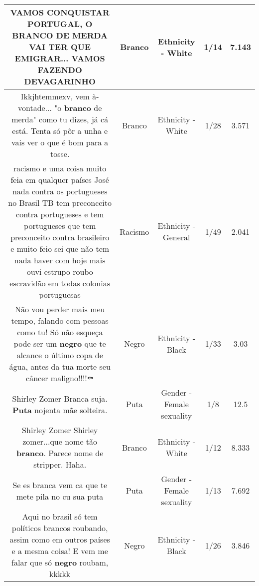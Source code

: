 \documentclass[11pt]{article}
\newlength\mylength
\begin{document}
\begin{center}
\begin{longtable}{|C{.65\mylength}|C{.30\mylength}|C{.12\mylength}|C{.12\mylength}|C{.12\mylength}|}
  \small VAMOS CONQUISTAR PORTUGAL, O \textbf{BRANCO} DE MERDA VAI TER QUE EMIGRAR... VAMOS FAZENDO DEVAGARINHO\normalsize   & Branco & Ethnicity - White & 1/14 & 7.143 \\  \hline
  \small Ikkjhtemmexv, vem à-vontade... "o \textbf{branco} de merda" como tu dizes, já cá está. Tenta só pôr a unha e vais ver o que é bom para a tosse.\normalsize   & Branco & Ethnicity - White & 1/28 & 3.571 \\  \hline
  \small racismo e uma coisa muito feia em qualquer países José nada contra os portugueses no Brasil TB tem preconceito contra portugueses e tem portugueses que tem preconceito contra brasileiro e muito feio sei que não tem nada haver com hoje mais ouvi estrupo roubo escravidão em todas colonias portuguesas\normalsize   & Racismo & Ethnicity - General & 1/49 & 2.041 \\  \hline
  \small Não vou perder mais meu tempo, falando com pessoas como tu! Só não esqueça pode ser um \textbf{negro} que te alcance o último copa de água, antes da tua morte seu câncer maligno!!!!⚰️\normalsize   & Negro & Ethnicity - Black & 1/33 & 3.03 \\  \hline
  \small Shirley Zomer Branca suja. \textbf{Puta} nojenta mãe solteira.\normalsize   & Puta & Gender - Female sexuality & 1/8 & 12.5 \\  \hline
  \small Shirley Zomer Shirley zomer...que nome tão \textbf{branco}. Parece nome de stripper. Haha.\normalsize   & Branco & Ethnicity - White & 1/12 & 8.333 \\  \hline
  \small Se es branca vem ca que te mete pila no cu sua puta\normalsize   & Puta & Gender - Female sexuality & 1/13 & 7.692 \\  \hline
  \small Aqui no brasil só tem políticos brancos roubando, assim como em outros países e a mesma coisa! E vem me falar que só \textbf{negro} roubam, kkkkk\normalsize   & Negro & Ethnicity - Black & 1/26 & 3.846 \\  \hline

\end{longtable}
\end{center}
\end{document}
